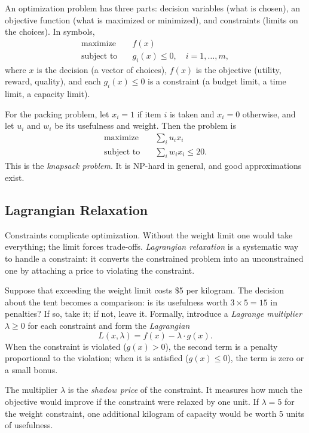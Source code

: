 \documentclass[11pt]{book}
\begin{document}
An optimization problem has three parts: decision variables (what is chosen), an objective function (what is maximized or minimized), and constraints (limits on the choices). In symbols,
\begin{align*}
\text{maximize} \quad & f(x) \\
\text{subject to} \quad & g_i(x) \leq 0, \quad i = 1, \ldots, m,
\end{align*}
where $x$ is the decision (a vector of choices), $f(x)$ is the objective (utility, reward, quality), and each $g_i(x) \leq 0$ is a constraint (a budget limit, a time limit, a capacity limit).

For the packing problem, let $x_i = 1$ if item $i$ is taken and $x_i = 0$ otherwise, and let $u_i$ and $w_i$ be its usefulness and weight. Then the problem is
\begin{align*}
\text{maximize} \quad & \sum_i u_i x_i \\
\text{subject to} \quad & \sum_i w_i x_i \leq 20.
\end{align*}
This is the \emph{knapsack problem}. It is NP-hard in general, and good approximations exist.

\subsection{Lagrangian Relaxation}

Constraints complicate optimization. Without the weight limit one would take everything; the limit forces trade-offs. \emph{Lagrangian relaxation} is a systematic way to handle a constraint: it converts the constrained problem into an unconstrained one by attaching a price to violating the constraint.

Suppose that exceeding the weight limit costs \$5 per kilogram. The decision about the tent becomes a comparison: is its usefulness worth $3 \times 5 = 15$ in penalties? If so, take it; if not, leave it. Formally, introduce a \emph{Lagrange multiplier} $\lambda \geq 0$ for each constraint and form the \emph{Lagrangian}
\[
L(x, \lambda) = f(x) - \lambda \cdot g(x).
\]
When the constraint is violated ($g(x) > 0$), the second term is a penalty proportional to the violation; when it is satisfied ($g(x) \leq 0$), the term is zero or a small bonus.

The multiplier $\lambda$ is the \emph{shadow price} of the constraint. It measures how much the objective would improve if the constraint were relaxed by one unit. If $\lambda = 5$ for the weight constraint, one additional kilogram of capacity would be worth 5 units of usefulness.
\end{document}
